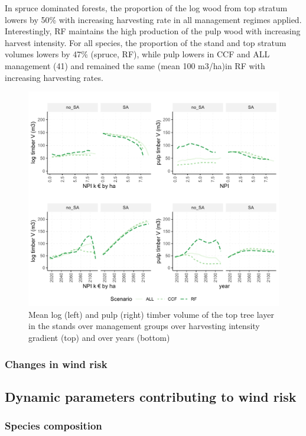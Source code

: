 \documentclass[]{elsarticle} %
\makeatletter
\def\maxwidth{\ifdim\Gin@nat@width>\linewidth\linewidth
\else\Gin@nat@width\fi}
\let\Oldincludegraphics\includegraphics
\renewcommand{\includegraphics}[1]{\Oldincludegraphics[width=\maxwidth]{#1}}
\makeatother
\begin{document}
In spruce dominated forests, the proportion of the log wood from top
stratum lowers by 50\% with increasing harvesting rate in all management
regimes applied. Interestingly, RF maintains the high production of the
pulp wood with increasing harvest intensity. For all species, the
proportion of the stand and top stratum volumes lowers by 47\% (spruce,
RF), while pulp lowers in CCF and ALL management (41) and remained the
same (mean 100 m3/ha)in RF with increasing harvesting rates.

\begin{figure}
\centering
\includegraphics{test_manus_files/figure-latex/V-stand-stratum-1.pdf}
\caption{\label{fig:V-stand-stratum}Mean log (left) and pulp (right) timber
volume of the top tree layer in the stands over management groups over
harvesting intensity gradient (top) and over years (bottom)}
\end{figure}

\subsubsection{Changes in wind risk}\label{changes-in-wind-risk}

\subsection{Dynamic parameters contributing to wind
risk}\label{dynamic-parameters-contributing-to-wind-risk}

\subsubsection{Species composition}\label{species-composition}
\end{document}
